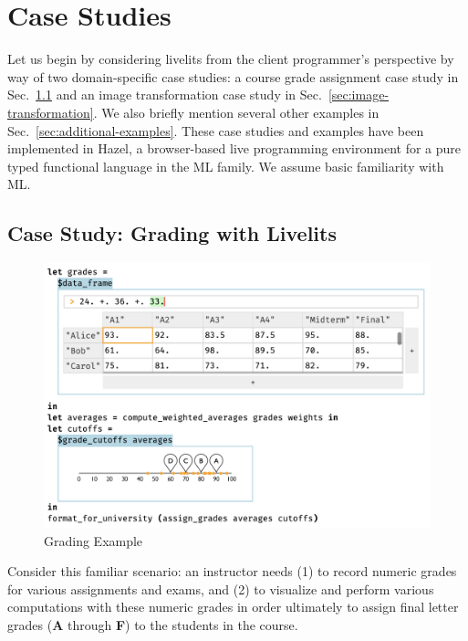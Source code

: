 \section{Case Studies}\label{sec:case-studies}
Let us begin by considering livelits from the client programmer's perspective by way of
two domain-specific case studies:
a course grade assignment case study in Sec.~\ref{sec:live-grading}
and an image transformation case study in Sec.~\ref{sec:image-transformation}.
We also briefly mention several other examples in Sec.~\ref{sec:additional-examples}.
These case studies and examples have been implemented
in Hazel, a browser-based live programming environment for a pure typed functional language in the
ML family. We assume basic familiarity with ML.

\subsection{Case Study: Grading with Livelits}\label{sec:live-grading}
\begin{figure}
    \includegraphics[width=30pc]{grade-cutoff-livelit.png}
\caption{Grading Example}
\label{fig:grading}
\end{figure}

Consider this familiar scenario: an instructor needs
(1) to record numeric grades for various assignments and exams, and
(2) to visualize and perform various computations with these numeric grades
in order ultimately to assign final letter grades (\textbf{A} through \textbf{F}) to the students in the course.


